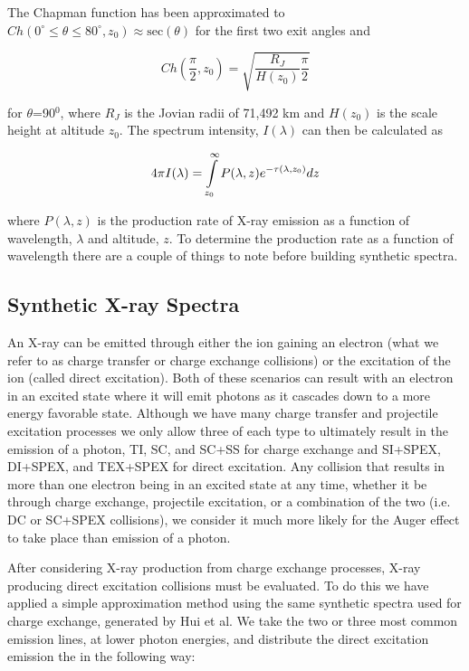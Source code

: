 \documentclass[draft]{agujournal2018}
\begin{document}
The Chapman function has been approximated to $Ch(0^{\circ} \leq \theta \leq 80^{\circ},z_{0}) \approx \mathrm{sec}(\theta)$ for the first two exit angles and

\begin{equation}
    Ch(\frac{\pi}{2},z_{0})=\sqrt{\frac{R_J}{H(z_0)}\frac{\pi}{2}}
    \label{eqn:Chap}
\end{equation}

\noindent for $\theta$=90$^{0}$, where $R_J$ is the Jovian radii of 71,492 km and $H(z_0)$ is the scale height at altitude $z_0$.
The spectrum intensity, $I(\lambda)$ can then be calculated as

\begin{equation}
    4\pi I(\lambda)=\int\displaylimits_{z_0}^{\infty}P(\lambda,z)e^{-\tau(\lambda,z_0)}dz
    \label{eqn:I}
\end{equation}

\noindent where $P(\lambda,z)$ is the production rate of X-ray emission as a function of wavelength, $\lambda$ and altitude, $z$.
To determine the production rate as a function of wavelength there are a couple of things to note before building synthetic spectra.

\subsection{Synthetic X-ray Spectra}

An X-ray can be emitted through either the ion gaining an electron (what we refer to as charge transfer or charge exchange collisions) or the excitation of the ion (called direct excitation).
Both of these scenarios can result with an electron in an excited state where it will emit photons as it cascades down to a more energy favorable state.
Although we have many charge transfer and projectile excitation processes we only allow three of each type to ultimately result in the emission of a photon, TI, SC, and SC+SS for charge exchange and SI+SPEX, DI+SPEX, and TEX+SPEX for direct excitation.
Any collision that results in more than one electron being in an excited state at any time, whether it be through charge exchange, projectile excitation, or a combination of the two (i.e. DC or SC+SPEX collisions), we consider it much more likely for the Auger effect to take place than emission of a photon.

After considering X-ray production from charge exchange processes, X-ray producing direct excitation collisions must be evaluated.
To do this we have applied a simple approximation method using the same synthetic spectra used for charge exchange, generated by Hui et al.
We take the two or three most common emission lines, at lower photon energies, and distribute the direct excitation emission the in the following way:
\end{document}
